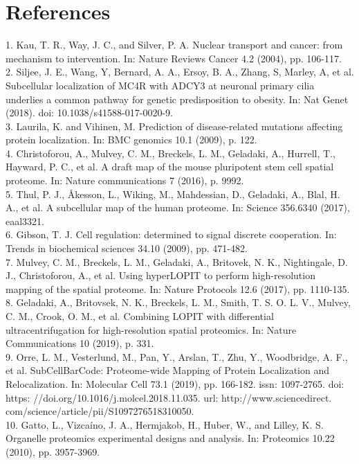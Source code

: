 \documentclass[12pt,english]{article}
\begin{document}
\section{References}
1. Kau, T. R., Way, J. C., and Silver, P. A. Nuclear transport and cancer: from mechanism
to intervention. In: Nature Reviews Cancer 4.2 (2004), pp. 106-117.
\\
2. Siljee, J. E., Wang, Y, Bernard, A. A., Ersoy, B. A., Zhang, S, Marley, A, et al.
Subcellular localization of MC4R with ADCY3 at neuronal primary cilia underlies
a common pathway for genetic predisposition to obesity. In: Nat Genet (2018). doi:
10.1038/s41588-017-0020-9.
\\
3. Laurila, K. and Vihinen, M. Prediction of disease-related mutations affecting protein
localization. In: BMC genomics 10.1 (2009), p. 122.
\\
4. Christoforou, A., Mulvey, C. M., Breckels, L. M., Geladaki, A., Hurrell, T., Hayward,
P. C., et al. A draft map of the mouse pluripotent stem cell spatial proteome. In:
Nature communications 7 (2016), p. 9992.
\\
5. Thul, P. J., Åkesson, L., Wiking, M., Mahdessian, D., Geladaki, A., Blal, H. A., et al.
A subcellular map of the human proteome. In: Science 356.6340 (2017), eaal3321.
\\
6. Gibson, T. J. Cell regulation: determined to signal discrete cooperation. In: Trends
in biochemical sciences 34.10 (2009), pp. 471-482.
\\
7. Mulvey, C. M., Breckels, L. M., Geladaki, A., Britovek, N. K., Nightingale, D. J.,
Christoforou, A., et al. Using hyperLOPIT to perform high-resolution mapping of the
spatial proteome. In: Nature Protocols 12.6 (2017), pp. 1110-135.
\\
8. Geladaki, A., Britovsek, N. K., Breckels, L. M., Smith, T. S. O. L. V., Mulvey, C. M.,
Crook, O. M., et al. Combining LOPIT with differential ultracentrifugation for high-resolution
spatial proteomics. In: Nature Communications 10 (2019), p. 331.
\\
9. Orre, L. M., Vesterlund, M., Pan, Y., Arslan, T., Zhu, Y., Woodbridge, A. F., et
al. SubCellBarCode: Proteome-wide Mapping of Protein Localization and Relocalization. In: Molecular Cell 73.1 (2019), pp. 166-182. issn: 1097-2765. doi: https:
//doi.org/10.1016/j.molcel.2018.11.035. url: http://www.sciencedirect.
com/science/article/pii/S1097276518310050.
\\
10. Gatto, L., Vizcaíno, J. A., Hermjakob, H., Huber, W., and Lilley, K. S. Organelle
proteomics experimental designs and analysis. In: Proteomics 10.22 (2010), pp. 3957-3969.
\end{document}
